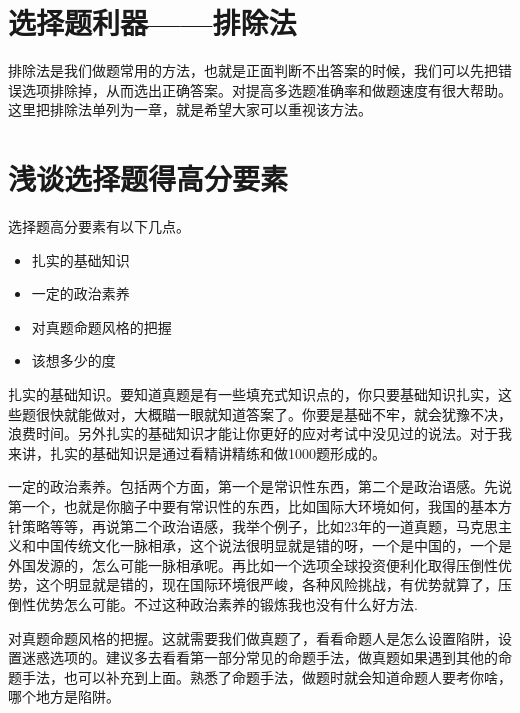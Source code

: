 \documentclass[lang=cn,blue,10pt,scheme=chinese,twocol]{zznote}
\begin{document}
\chapter{选择题利器——排除法}
\begin{definition}
	排除法是我们做题常用的方法，也就是正面判断不出答案的时候，我们可以先把错误选项排除掉，从而选出正确答案。对提高多选题准确率和做题速度有很大帮助。这里把排除法单列为一章，就是希望大家可以重视该方法。
\end{definition}
\chapter{浅谈选择题得高分要素}
选择题高分要素有以下几点。
\begin{itemize}
	\item 扎实的基础知识
	\item 一定的政治素养
	\item 对真题命题风格的把握
	\item 该想多少的度
\end{itemize}


\begin{definition}[扎实的基础知识]
	扎实的基础知识。要知道真题是有一些填充式知识点的，你只要基础知识扎实，这些题很快就能做对，大概瞄一眼就知道答案了。你要是基础不牢，就会犹豫不决，浪费时间。另外扎实的基础知识才能让你更好的应对考试中没见过的说法。对于我来讲，扎实的基础知识是通过看精讲精练和做1000题形成的。
\end{definition}


\begin{definition}[一定的政治素养]
	一定的政治素养。包括两个方面，第一个是常识性东西，第二个是政治语感。先说第一个，也就是你脑子中要有常识性的东西，比如国际大环境如何，我国的基本方针策略等等，再说第二个政治语感，我举个例子，比如23年的一道真题，马克思主义和中国传统文化一脉相承，这个说法很明显就是错的呀，一个是中国的，一个是外国发源的，怎么可能一脉相承呢。再比如一个选项全球投资便利化取得压倒性优势，这个明显就是错的，现在国际环境很严峻，各种风险挑战，有优势就算了，压倒性优势怎么可能。不过这种政治素养的锻炼我也没有什么好方法.
\end{definition}

\begin{definition}[对真题命题风格的把握]
	对真题命题风格的把握。这就需要我们做真题了，看看命题人是怎么设置陷阱，设置迷惑选项的。建议多去看看第一部分常见的命题手法，做真题如果遇到其他的命题手法，也可以补充到上面。熟悉了命题手法，做题时就会知道命题人要考你啥，哪个地方是陷阱。
\end{definition}
\end{document}

